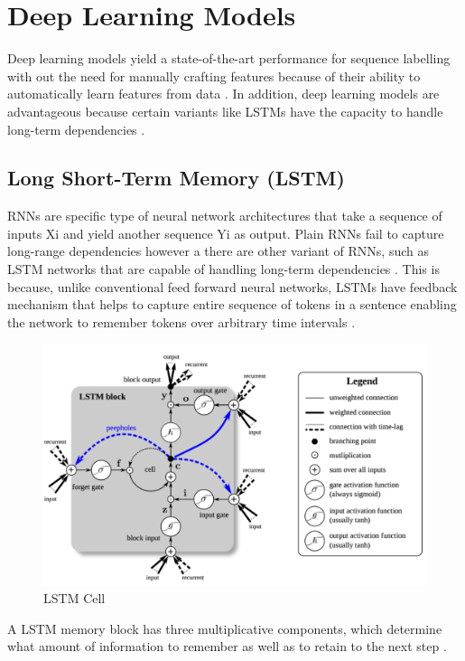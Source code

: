 \section{Deep Learning Models }
\label{sec:chapter05:MLModels:DLMs}

Deep learning models yield a state-of-the-art performance for sequence labelling with out the need for manually crafting features because of their ability to automatically learn features from data \citep{he2020survey}. In addition, deep learning models are advantageous because certain variants like \ac{LSTM}s have the capacity to handle long-term dependencies \citep{akhundov2018sequence}. 



\subsection{Long Short-Term Memory (\ac{LSTM})}
\label{sec:chapter05:DLModels:LSTM}

\ac{RNN}s are specific type of neural network architectures that take a sequence of inputs Xi and yield another sequence Yi as output. Plain RNNs fail to capture long-range dependencies however a there are other variant of RNNs, such as LSTM networks that are capable of handling long-term dependencies \citep{akhundov2018sequence, lample2016neural}. This is because, unlike conventional feed forward neural networks, LSTMs have feedback mechanism that helps to capture entire sequence of tokens in a sentence enabling the network to remember tokens over arbitrary time intervals \citep{enwiki:1073570927}. \\

\begin{figure}[htbp]
	\centering
	\includegraphics[width=.65\textwidth]{4.graphics/figures/ch_5/pdf/LSTM_cell}
	\caption{\ac{LSTM} Cell \citep{ma2016end}}
	\label{fig:chapter03:setup}
\end{figure}

A \ac{LSTM} memory block has three multiplicative components, which determine what amount of information to remember as well as to retain to the next step \citep{ma2016end}. 


